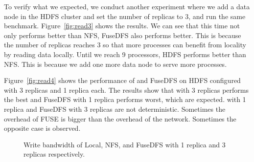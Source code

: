 To verify what we expected, we conduct another experiment where we add a data
node in the HDFS cluster and set the
number of replicas to 3, and run the same benchmark. Figure~\ref{fig:read3}
shows the results. We can see that this time not only {\proj} performs better
than NFS, FuseDFS also performs better. This is because the number of replicas
reaches 3 so that more processes can benefit from locality by reading data
locally. Until we reach 9 processors, HDFS
performs better than NFS. This is because we add one more data node to
serve more processes.


Figure~\ref{fig:read4} shows the performance of {\proj} and FuseDFS on HDFS
configured with 3 replicas and 1 replica each. The results show that {\proj}
with 3 replicas performs the best and FuseDFS with 1 replica performs worst,
which are expected. {\proj} with 1 replica and FuseDFS with 3 replicas are not
deterministic. Sometimes the overhead of FUSE is bigger than the overhead of the
network. Sometimes the opposite case is observed. 

\begin{figure}[t]
\begin{center}
\caption{\small Write bandwidth of Local, NFS, {\proj} and FuseDFS
with 1 replica and 3 replicas respectively.}
\label{fig:write}
\vspace{-6pt}
\end{center}
\end{figure}

